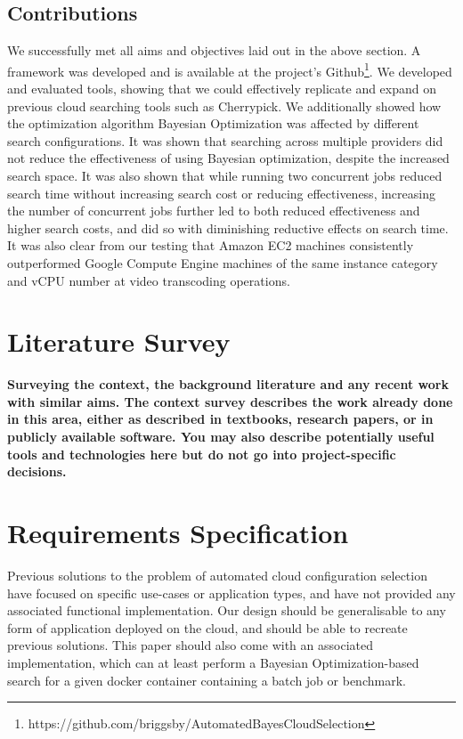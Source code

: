 \documentclass{article}
\begin{document}
\subsection{Contributions}
We successfully met all aims and objectives laid out in the above section. A framework was developed and is available at the project's Github\footnote{https://github.com/briggsby/AutomatedBayesCloudSelection}. We developed and evaluated tools, showing that we could effectively replicate and expand on previous cloud searching tools such as Cherrypick\cite{Alipourfard2017}.
We additionally showed how the optimization algorithm Bayesian Optimization was affected by different search configurations. It was shown that searching across multiple providers did not reduce the effectiveness of using Bayesian optimization, despite the increased search space. It was also shown that while running two concurrent jobs reduced search time without increasing search cost or reducing effectiveness, increasing the number of concurrent jobs further led to both reduced effectiveness and higher search costs, and did so with diminishing reductive effects on search time.
It was also clear from our testing that Amazon EC2 machines consistently outperformed Google Compute Engine machines of the same instance category and vCPU number at video transcoding operations.

\section{Literature Survey}
\textbf{Surveying the context, the background literature and any
recent work with similar aims. The context survey
describes the work already done in this area, either as
described in textbooks, research papers, or in publicly
available software. You may also describe potentially
useful tools and technologies here but do not go into
project-specific decisions.}




\section{Requirements Specification}
Previous solutions to the problem of automated cloud configuration selection have focused on specific use-cases or application types, and have not provided any associated functional implementation.  Our design should be generalisable to any form of application deployed on the cloud, and should be able to recreate previous solutions. This paper should also come with an associated implementation, which can at least perform a Bayesian Optimization-based search for a given docker container containing a batch job or benchmark.
\end{document}
